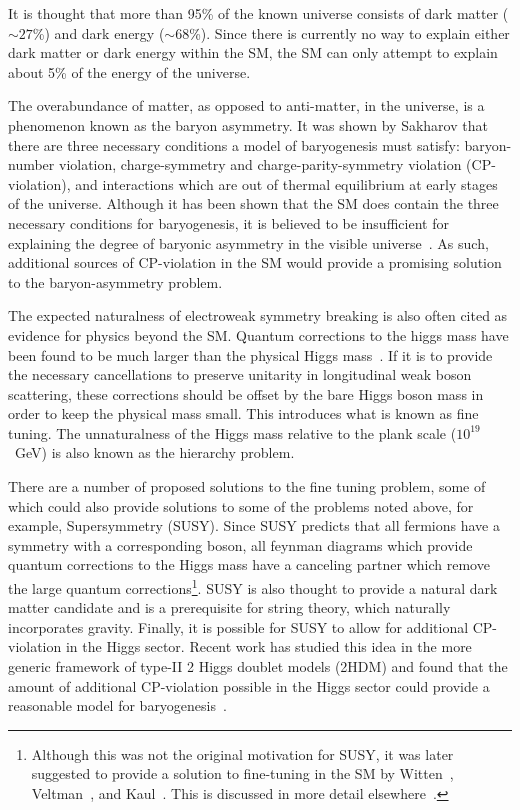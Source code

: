 It is thought that more than 95\% of the known universe consists 
of dark matter ($\sim27$\%) and dark energy
($\sim68$\%)\cite{Sullivan:2011kv}.
Since there is currently no way to explain either dark matter or 
dark energy within the SM, the SM can only attempt to explain
about 5\% of the energy of the universe.

The overabundance of matter, as opposed to anti-matter, in the 
universe, is a phenomenon known as the baryon asymmetry.
It was shown by Sakharov\cite{Sakharov:1967dj} that there are 
three necessary 
conditions a model of baryogenesis must satisfy: baryon-number 
violation, charge-symmetry and charge-parity-symmetry violation (CP-violation), and interactions 
which are out of thermal equilibrium at early stages of the 
universe.  Although it has been shown that the SM does
contain the three necessary conditions for baryogenesis, it is 
believed to be insufficient for explaining the degree of baryonic 
asymmetry in the visible 
universe~\cite{Jarlskog:1985ht,Shaposhnikov:1986jp}.  As such,
additional sources of CP-violation in the SM would provide a
promising solution to the baryon-asymmetry problem.  

The expected naturalness of electroweak symmetry breaking is
also often cited as evidence for physics beyond the SM.  
Quantum corrections to the higgs mass have been found to be much 
larger than the physical Higgs mass~\cite{Aitchison:2007}. 
If it is to 
provide the 
necessary cancellations to preserve unitarity in longitudinal weak 
boson scattering, these corrections should be offset by the 
bare Higgs boson
mass in order to keep the physical mass small.  This introduces
what is known as fine tuning.  The unnaturalness of the Higgs mass
relative to the plank scale ($10^{19}$~GeV) is also known as the
hierarchy problem.

There are a 
number of proposed solutions to the fine tuning problem, some 
of which 
could also provide solutions to some of the problems noted above,
for example, Supersymmetry (SUSY).  
Since SUSY predicts that all fermions have a symmetry with a 
corresponding boson, 
all feynman diagrams which provide quantum corrections to the Higgs 
mass have a canceling partner which remove the large quantum 
corrections\footnote{Although this was not the original motivation
for SUSY, it was later suggested to provide a solution to 
fine-tuning in the SM by Witten~\cite{Witten:1981nf}, 
Veltman~\cite{Veltman:1980mj}, and Kaul~\cite{Kaul:1981wp}.  
This is discussed in more detail elsewhere~\cite{Aitchison:2007}. }.
SUSY is also thought to provide a natural dark matter candidate and
is a prerequisite for string theory, which naturally incorporates 
gravity.  Finally, it is possible 
for SUSY to allow for additional CP-violation in the Higgs sector.
Recent work has studied this idea in the more generic framework of
type-II 2 Higgs doublet models (2HDM) and found that the amount of
additional CP-violation possible in the Higgs sector could provide
a reasonable model for baryogenesis~\cite{Shu:2013uua}.  

